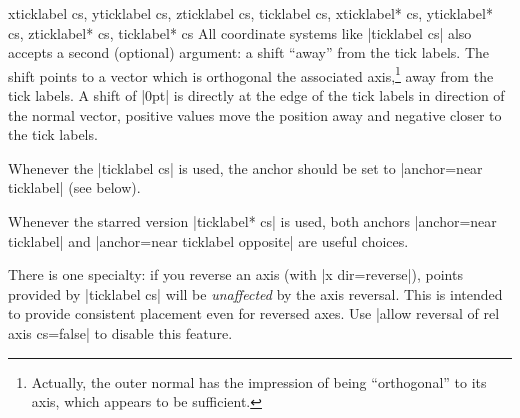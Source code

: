 \begin{coordinatesystemlist}{%
    xticklabel cs,
    yticklabel cs,
    zticklabel cs,
    ticklabel cs,
    xticklabel* cs,
    yticklabel* cs,
    zticklabel* cs,
    ticklabel* cs%
}
    All coordinate systems like |ticklabel cs| also accepts a second (optional)
    argument: a shift ``away'' from the tick labels. The shift points to a
    vector which is orthogonal the associated axis,\footnote{Actually, the
    outer normal has the impression of being ``orthogonal'' to its axis, which
    appears to be sufficient.} away from the tick labels. A shift of |0pt| is
    directly at the edge of the tick labels in direction of the normal vector,
    positive values move the position away and negative closer to the tick
    labels.
\begin{codeexample}[width=4cm]
\end{codeexample}

    Whenever the |ticklabel cs| is used, the anchor should be set to
    |anchor=near ticklabel| (see below).

    Whenever the starred version |ticklabel* cs| is used, both anchors
    |anchor=near ticklabel| and |anchor=near ticklabel opposite| are useful
    choices.

    There is one specialty: if you reverse an axis (with |x dir=reverse|),
    points provided by |ticklabel cs| will be \emph{unaffected} by the axis
    reversal. This is intended to provide consistent placement even for
    reversed axes. Use |allow reversal of rel axis cs=false| to disable this
    feature.


\end{coordinatesystemlist}
